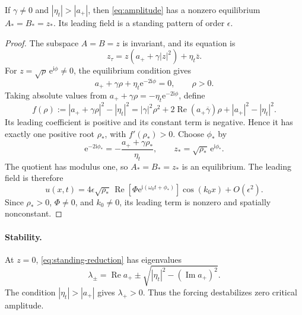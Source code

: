 \documentclass[11pt]{article}
\newcommand{\ii}{\mathrm{i}}
\newcommand{\ee}{\mathrm{e}}
\DeclareMathOperator{\RePart}{Re}
\begin{document}
\begin{proposition}
If $\gamma\neq0$ and $|\eta_t|>|a_+|$, then
\eqref{eq:amplitude} has a nonzero equilibrium $A_*=B_*=z_*$.
Its leading field is a standing pattern of order $\epsilon$.
\end{proposition}
\begin{proof}
The subspace $A=B=z$ is invariant, and its equation is
\begin{equation}
 z_\tau=z(a_++\gamma|z|^2)+\eta_t\overline z.
 \label{eq:standing-reduction}
\end{equation}
For $z=\sqrt\rho\,\ee^{\ii\phi}\neq0$, the equilibrium condition gives
\begin{equation}
 a_++\gamma\rho+\eta_t\ee^{-2\ii\phi}=0,
 \qquad \rho>0.
 \label{eq:standing-phase}
\end{equation}
Taking absolute values from $a_++\gamma\rho=-\eta_t\ee^{-2\ii\phi}$, define
\begin{equation}
 f(\rho):=|a_++\gamma\rho|^2-|\eta_t|^2
 =|\gamma|^2\rho^2+2\RePart(a_+\overline\gamma)\rho
   +|a_+|^2-|\eta_t|^2.
 \label{eq:standing-polynomial}
\end{equation}
Its leading coefficient is positive and its constant term is negative.
Hence it has exactly one positive root $\rho_*$, with $f'(\rho_*)>0$.
Choose $\phi_*$ by
\begin{equation}
 \ee^{-2\ii\phi_*}=-\frac{a_++\gamma\rho_*}{\eta_t},
 \qquad z_*=\sqrt{\rho_*}\,\ee^{\ii\phi_*}.
 \label{eq:standing-equilibrium}
\end{equation}
The quotient has modulus one, so $A_*=B_*=z_*$ is an equilibrium.
The leading field is therefore
\begin{equation}
 u(x,t)=4\epsilon\sqrt{\rho_*}\,
 \RePart\!\left[\Phi\ee^{\ii(\omega_0t+\phi_*)}\right]
 \cos(k_0x)+O(\epsilon^2).
 \label{eq:below-onset-pattern}
\end{equation}
Since $\rho_*>0$, $\Phi\neq0$, and $k_0\neq0$, its leading term is
nonzero and spatially nonconstant.
\end{proof}

\paragraph{Stability.}
At $z=0$, \eqref{eq:standing-reduction} has eigenvalues
\begin{equation}
 \lambda_\pm=\RePart a_+
 \pm\sqrt{|\eta_t|^2-(\operatorname{Im}a_+)^2}.
 \label{eq:standing-zero-spectrum}
\end{equation}
The condition $|\eta_t|>|a_+|$ gives $\lambda_+>0$.
Thus the forcing destabilizes zero critical amplitude.
\end{document}
